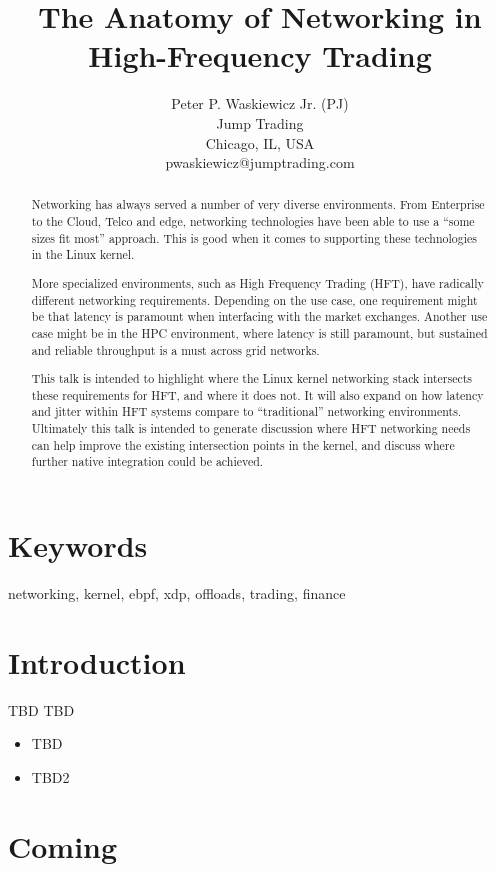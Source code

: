 \documentclass[letterpaper]{article}
\title{The Anatomy of Networking in High-Frequency Trading}
\author{Peter P. Waskiewicz Jr. (PJ) \\ Jump Trading \\ Chicago, IL, USA \\ pwaskiewicz@jumptrading.com
\newline
\newline
}
\begin{document}
 
\maketitle
\begin{abstract}
Networking has always served a number of very diverse environments. From Enterprise to the Cloud, Telco and edge, networking technologies have been able to use a “some sizes fit most” approach. This is good when it comes to supporting these technologies in the Linux kernel.

More specialized environments, such as High Frequency Trading (HFT), have radically different networking requirements. Depending on the use case, one requirement might be that latency is paramount when interfacing with the market exchanges. Another use case might be in the HPC environment, where latency is still paramount, but sustained and reliable throughput is a must across grid networks.

This talk is intended to highlight where the Linux kernel networking stack intersects these requirements for HFT, and where it does not. It will also expand on how latency and jitter within HFT systems compare to “traditional” networking environments. Ultimately this talk is intended to generate discussion where HFT networking needs can help improve the existing intersection points in the kernel, and discuss where further native integration could be achieved.
\end{abstract}

\section{Keywords}

networking, kernel, ebpf, xdp, offloads, trading, finance

\section{Introduction}
TBD
\newline
\newline
TBD
\begin{itemize}
\item TBD
\item TBD2
\end{itemize}

\section{Coming}
\end{document}
